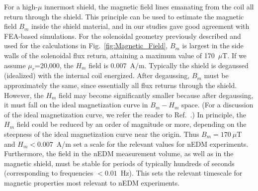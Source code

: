 For a high-$\mu$ innermost shield, the magnetic field lines emanating
from the coil all return through the shield.  This principle can be
used to estimate the magnetic field $B_m$ inside the shield material,
and in our studies gave good agreement with FEA-based simulations.
For the solenoidal geometry previously described and used for the
calculations in Fig.~\ref{fig:Magnetic_Field}, $B_m$ is largest in the
side walls of the solenoidal flux return, attaining a maximum value of
170~$\mu$T.  If we assume $\mu_r$=20,000, the $H_m$ field is
0.007~A/m.  Typically the shield is degaussed (idealized) with the
internal coil energized.  After degaussing, $B_m$ must be
approximately the same, since essentially all flux returns through the
shield.  However, the $H_m$ field may become significantly smaller
because after degaussing, it must fall on the ideal magnetization
curve in $B_m-H_m$ space.  (For a discussion of the ideal
magnetization curve, we refer the reader to Ref.~\cite{bib:bozorth}.)
In principle, the $H_m$ field could be reduced by an order of
magnitude or more, depending on the steepness of the ideal
magnetization curve near the origin.  Thus $B_m=170~\mu$T and
$H_m<0.007$~A/m set a scale for the relevant values for nEDM
experiments.  Furthermore, the field in the nEDM measurement volume,
as well as in the magnetic shield, must be stable for periods of
typically hundreds of seconds (corresponding to frequencies
$<0.01$~Hz).  This sets the relevant timescale for magnetic properties
most relevant to nEDM experiments.
